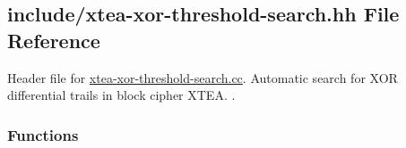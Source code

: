 \hypertarget{xtea-xor-threshold-search_8hh}{\subsection{include/xtea-\/xor-\/threshold-\/search.hh \-File \-Reference}
\label{xtea-xor-threshold-search_8hh}
}


\-Header file for \hyperlink{xtea-xor-threshold-search_8cc}{xtea-\/xor-\/threshold-\/search.\-cc}. \-Automatic search for \-X\-O\-R differential trails in block cipher \-X\-T\-E\-A. .  


\subsubsection*{\-Functions}
